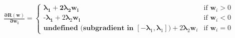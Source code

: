 \documentclass[preview]{standalone}
\begin{document}
\begin{align*}
\mathbf{\frac{\partial R(w)}{\partial w_i}} =\begin{cases}\boldsymbol{\lambda}_\textbf{1} + \textbf{2}\boldsymbol{\lambda}_\textbf{2} \mathbf{w_i} & \text{if } \mathbf{w}_i > 0 \\\textbf{-}\boldsymbol{\lambda}_\textbf{1} + 2\mathbf{\lambda}_2 \mathbf{w_i} & \text{if } \mathbf{w}_i < 0 \\\textbf{undefined (subgradient in } [-\boldsymbol{\lambda}_1, \boldsymbol{\lambda}_1]\textbf{)} + 2\mathbf{\lambda}_2 \mathbf{w}_i & \text{if } \mathbf{w}_i = 0\end{cases}
\end{align*}
\end{document}
